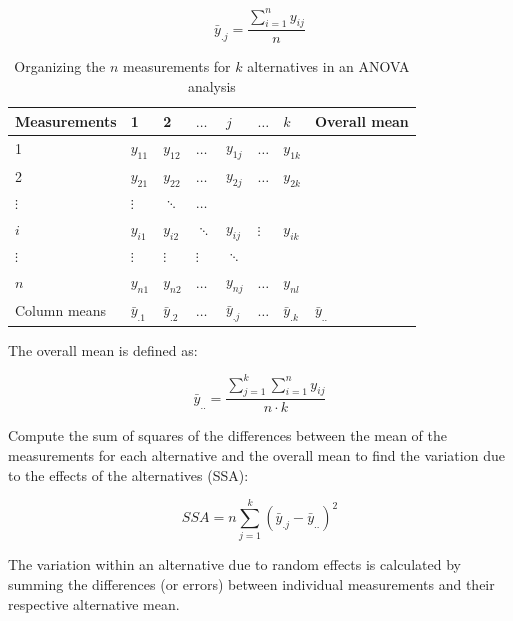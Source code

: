 \begin{equation}
  \bar{y}_{.j} = \frac{\sum^n_{i = 1}y_{ij}}{n}
\end{equation}


\begin{table}
\begin{center}
\begin{tabular}{|l|l|l|l|l|l|l|l|}
\hline
Measurements & 1 & 2 & \(\hdots\) & \(j\) & \(\hdots\) & \(k\) & Overall mean\\[0pt]
\hline
1 & \(y_{11}\) & \(y_{12}\) & \(\hdots\) & \(y_{1j}\) & \(\hdots\) & \(y_{1k}\) & \\[0pt]
2 & \(y_{21}\) & \(y_{22}\) & \(\hdots\) & \(y_{2j}\) & \(\hdots\) & \(y_{2k}\) & \\[0pt]
\(\vdots\) & \(\vdots\) & \(\ddots\) & \(\hdots\) &  &  &  & \\[0pt]
\(i\) & \(y_{i1}\) & \(y_{i2}\) & \(\ddots\) & \(y_{ij}\) & \(\vdots\) & \(y_{ik}\) & \\[0pt]
\(\vdots\) & \(\vdots\) & \(\vdots\) & \(\vdots\) & \(\ddots\) &  &  & \\[0pt]
\(n\) & \(y_{n1}\) & \(y_{n2}\) & \(\hdots\) & \(y_{nj}\) & \(\hdots\) & \(y_{nl}\) & \\[0pt]
\hline
Column means & \(\bar{y}_{.1}\) & \(\bar{y}_{.2}\) & \(\hdots\) & \(\bar{y}_{.j}\) & \(\hdots\) & \(\bar{y}_{.k}\) & \(\bar{y}_{..}\)\\[0pt]
\hline
\end{tabular}
\end{center}
\caption{\label{table:anova}Organizing the \(n\) measurements for \(k\) alternatives in an ANOVA analysis}
\end{table}

The overall mean is defined as:

\begin{equation}
  \bar{y}_{..} = \frac{\sum^k_{j = 1}\sum^n_{i = 1}y_{ij}}{n\cdot{}k}
\end{equation}

Compute the sum of squares of the differences between the mean of the measurements for each alternative and the overall mean to find the variation due to the effects of the alternatives (SSA):

\begin{equation}
    SSA = n \sum_{j = 1}^{k} (\bar{y}_{.j} - \bar{y}_{..})^2
\end{equation}

The variation within an alternative due to random effects is calculated by summing the differences (or errors) between individual measurements and their respective alternative mean.

